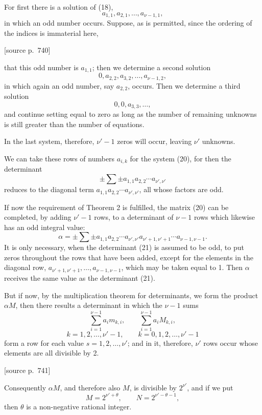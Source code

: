 \documentclass[11pt]{article}
\newcommand{\srcpage}[1]{\par\medskip\noindent\textsf{[source p.~#1]}\par\smallskip}
\begin{document}
For first there is a solution of (18),
\[
a_{1,1},a_{2,1},\ldots,a_{\nu-1,1},
\]
in which an odd number occurs. Suppose, as is permitted, since the ordering of the indices is immaterial here,
\srcpage{740}
that this odd number is $a_{1,1}$; then we determine a second solution
\[
0,a_{2,2},a_{3,2},\ldots,a_{\nu-1,2},
\]
in which again an odd number, say $a_{2,2}$, occurs. Then we determine a third solution
\[
0,0,a_{3,3},\ldots,
\]
and continue setting equal to zero as long as the number of remaining unknowns is still greater than the number of equations.

In the last system, therefore, $\nu'-1$ zeros will occur, leaving $\nu'$ unknowns.

We can take these rows of numbers $a_{i,k}$ for the system (20), for then the determinant
\begin{equation}
\pm\sum\pm a_{1,1}a_{2,2}\cdots a_{\nu',\nu'}
\tag{21}
\end{equation}
reduces to the diagonal term $a_{1,1}a_{2,2}\cdots a_{\nu',\nu'}$, all whose factors are odd.

If now the requirement of Theorem 2 is fulfilled, the matrix (20) can be completed, by adding $\nu'-1$ rows, to a determinant of $\nu-1$ rows which likewise has an odd integral value:
\begin{equation}
\alpha=\pm\sum\pm a_{1,1}a_{2,2}\cdots a_{\nu',\nu'}a_{\nu'+1,\nu'+1}\cdots a_{\nu-1,\nu-1}.
\tag{22}
\end{equation}
It is only necessary, when the determinant (21) is assumed to be odd, to put zeros throughout the rows that have been added, except for the elements in the diagonal row, $a_{\nu'+1,\nu'+1},\ldots,a_{\nu-1,\nu-1}$, which may be taken equal to 1. Then $\alpha$ receives the same value as the determinant (21).

But if now, by the multiplication theorem for determinants, we form the product $\alpha M$, then there results a determinant in which the $\nu-1$ sums
\[
\sum_{i=1}^{\nu-1}a_i m_{k,i},
\qquad
\sum_{i=1}^{\nu-1}a_i M_{k,i},
\]
\[
k=1,2,\ldots,\nu'-1,
\qquad
k=0,1,2,\ldots,\nu'-1
\]
form a row for each value $s=1,2,\ldots,\nu'$; and in it, therefore, $\nu'$ rows occur whose elements are all divisible by 2.

\srcpage{741}
Consequently $\alpha M$, and therefore also $M$, is divisible by $2^{\nu'}$, and if we put
\begin{equation}
M=2^{\nu'+\theta},\qquad N=2^{\nu'-\theta-1},
\tag{23}
\end{equation}
then $\theta$ is a non-negative rational integer.
\end{document}
